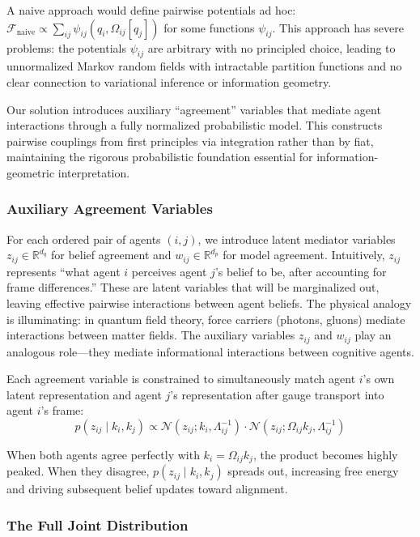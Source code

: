 \documentclass[11pt]{article}
\begin{document}
A naive approach would define pairwise potentials ad hoc: $\mathcal{F}_{\text{naive}} \propto \sum_{ij} \psi_{ij}(q_i, \Omega_{ij}[q_j])$ for some functions $\psi_{ij}$. This approach has severe problems: the potentials $\psi_{ij}$ are arbitrary with no principled choice, leading to unnormalized Markov random fields with intractable partition functions and no clear connection to variational inference or information geometry.

Our solution introduces auxiliary ``agreement'' variables that mediate agent interactions through a fully normalized probabilistic model. This constructs pairwise couplings from first principles via integration rather than by fiat, maintaining the rigorous probabilistic foundation essential for information-geometric interpretation.

\subsubsection{Auxiliary Agreement Variables}

For each ordered pair of agents $(i,j)$, we introduce latent mediator variables $z_{ij} \in \mathbb{R}^{d_q}$ for belief agreement and $w_{ij} \in \mathbb{R}^{d_p}$ for model agreement. Intuitively, $z_{ij}$ represents ``what agent $i$ perceives agent $j$'s belief to be, after accounting for frame differences.'' These are latent variables that will be marginalized out, leaving effective pairwise interactions between agent beliefs. The physical analogy is illuminating: in quantum field theory, force carriers (photons, gluons) mediate interactions between matter fields. The auxiliary variables $z_{ij}$ and $w_{ij}$ play an analogous role---they mediate informational interactions between cognitive agents.

Each agreement variable is constrained to simultaneously match agent $i$'s own latent representation and agent $j$'s representation after gauge transport into agent $i$'s frame:
\begin{equation}
p(z_{ij} \mid k_i, k_j) \propto \mathcal{N}(z_{ij}; k_i, \Lambda_{ij}^{-1}) \cdot \mathcal{N}(z_{ij}; \Omega_{ij}k_j, \Lambda_{ij}^{-1})
\end{equation}

When both agents agree perfectly with $k_i = \Omega_{ij}k_j$, the product becomes highly peaked. When they disagree, $p(z_{ij} \mid k_i, k_j)$ spreads out, increasing free energy and driving subsequent belief updates toward alignment.

\subsubsection{The Full Joint Distribution}
\end{document}
